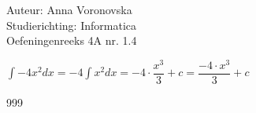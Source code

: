 \documentclass[a4paper]{article}
\begin{document}
\noindent \large Auteur: Anna Voronovska \\
\noindent \large Studierichting: Informatica \\
\noindent \large Oefeningenreeks 4A nr. 1.4 \\

\medskip 

\normalsize

 
$\displaystyle\int -4x^2 dx = -4 \displaystyle\int x^2 dx = -4 \cdot \dfrac{x^3}{3} + c=\dfrac{-4 \cdot x^3}{3} + c$\\

\begin{thebibliography}{999}
\end{thebibliography}
\end{document}
